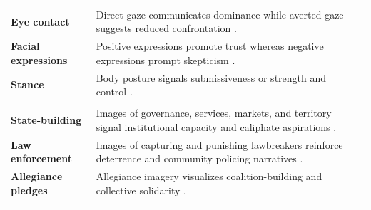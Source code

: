 \begin{longtable}{L{2.0cm} L{4.0cm} C{4.0cm}}
\textbf{Eye contact} &
Direct gaze communicates dominance while averted gaze suggests reduced confrontation \parencite{tang2015a}. &
\hfill
{}\\
\addlinespace

\textbf{Facial expressions} &
Positive expressions promote trust whereas negative expressions prompt skepticism \parencite{forgas2008a}. &
\hfill
{}\\
\addlinespace

\textbf{Stance} &
Body posture signals submissiveness or strength and control \parencite{green2015a,jewitt2008a}. &
\hfill
{}\\
\addlinespace

\\
\addlinespace

\textbf{State-building} &
Images of governance, services, markets, and territory signal institutional capacity and caliphate aspirations \parencite{damanhoury2022a,el2021a,lokmanoglu2020a,winkler2019a,zelin2015a}. &
\hfill
{}\\
\addlinespace

\textbf{Law enforcement} &
Images of capturing and punishing lawbreakers reinforce deterrence and community policing narratives \parencite{barr2017a,chouliaraki2018a,damanhoury2018a}. &
\hfill
{}\\
\addlinespace

\textbf{Allegiance pledges} &
Allegiance imagery visualizes coalition-building and collective solidarity \parencite{gregg2023a}. &
\hfill
{}\\
\addlinespace


\end{longtable}
